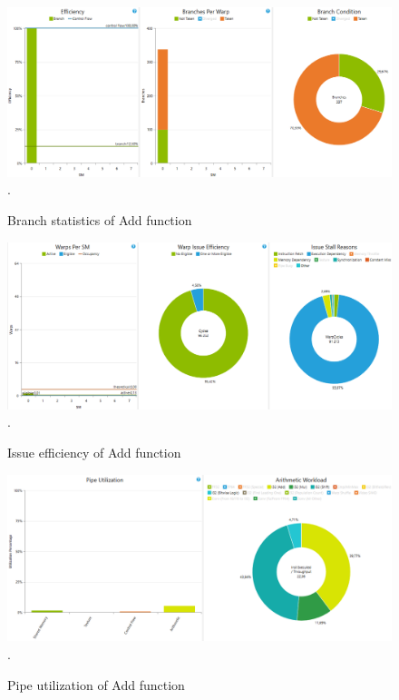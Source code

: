 \documentclass[oneside,openright,12pt,final,en]{mgr}
\begin{document}
\begin{figure}[H]
	\centering
	\includegraphics[width=\textwidth]{add_branch}.
	\caption{Branch statistics of Add function}
	\label{fig:add_branch}
\end{figure}

\begin{figure}[H]
	\centering
	\includegraphics[width=\textwidth]{add_issue}.
	\caption{Issue efficiency of Add function}
	\label{fig:add_issue}
\end{figure}

\begin{figure}[H]
	\centering
	\includegraphics[width=\textwidth]{add_pipe}.
	\caption{Pipe utilization of Add function}
	\label{fig:add_pipe}
\end{figure}
\end{document}
